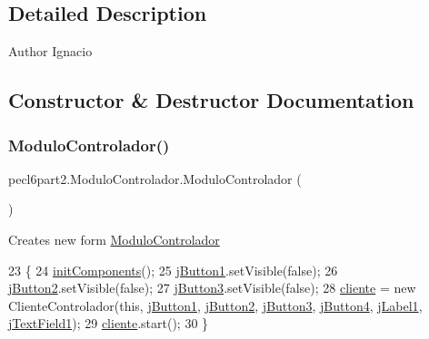 \subsection{Detailed Description}
\begin{DoxyAuthor}{Author}
Ignacio 
\end{DoxyAuthor}


\subsection{Constructor \& Destructor Documentation}
\mbox{\label{classpecl6part2_1_1_modulo_controlador_ae58d9d09e586f247facba0caab686943}} 
\subsubsection{\texorpdfstring{Modulo\+Controlador()}{ModuloControlador()}}
{\footnotesize\ttfamily pecl6part2.\+Modulo\+Controlador.\+Modulo\+Controlador (\begin{DoxyParamCaption}{ }\end{DoxyParamCaption})\hspace{0.3cm}{\ttfamily [inline]}}

Creates new form \mbox{\hyperlink{classpecl6part2_1_1_modulo_controlador}{Modulo\+Controlador}} 
\begin{DoxyCode}
23                                \{
24         \mbox{\hyperlink{classpecl6part2_1_1_modulo_controlador_a22ed1ef036362706199db39b74ec7be3}{initComponents}}();
25         \mbox{\hyperlink{classpecl6part2_1_1_modulo_controlador_acdf6c079fea2dc2a66c8b0e5f4ec10e3}{jButton1}}.setVisible(\textcolor{keyword}{false});
26         \mbox{\hyperlink{classpecl6part2_1_1_modulo_controlador_a38f1d50c40672c81a4ec1fa0a5fa1ca9}{jButton2}}.setVisible(\textcolor{keyword}{false});
27         \mbox{\hyperlink{classpecl6part2_1_1_modulo_controlador_a0e4337a4107a44ac33ceb447ee056f59}{jButton3}}.setVisible(\textcolor{keyword}{false});
28         \mbox{\hyperlink{classpecl6part2_1_1_modulo_controlador_a62308c2ac095ab8b16d1478b2577891e}{cliente}} = \textcolor{keyword}{new} ClienteControlador(\textcolor{keyword}{this}, \mbox{\hyperlink{classpecl6part2_1_1_modulo_controlador_acdf6c079fea2dc2a66c8b0e5f4ec10e3}{jButton1}}, \mbox{\hyperlink{classpecl6part2_1_1_modulo_controlador_a38f1d50c40672c81a4ec1fa0a5fa1ca9}{jButton2}}, 
      \mbox{\hyperlink{classpecl6part2_1_1_modulo_controlador_a0e4337a4107a44ac33ceb447ee056f59}{jButton3}}, \mbox{\hyperlink{classpecl6part2_1_1_modulo_controlador_a0fd427b07850c91ef7c49d42321b6ec4}{jButton4}}, \mbox{\hyperlink{classpecl6part2_1_1_modulo_controlador_a8f34e28c463eece3072679131fe0c448}{jLabel1}},  \mbox{\hyperlink{classpecl6part2_1_1_modulo_controlador_a7a8c12d92360f65dd601091c44ef20d9}{jTextField1}});
29         \mbox{\hyperlink{classpecl6part2_1_1_modulo_controlador_a62308c2ac095ab8b16d1478b2577891e}{cliente}}.start();
30     \}
\end{DoxyCode}


